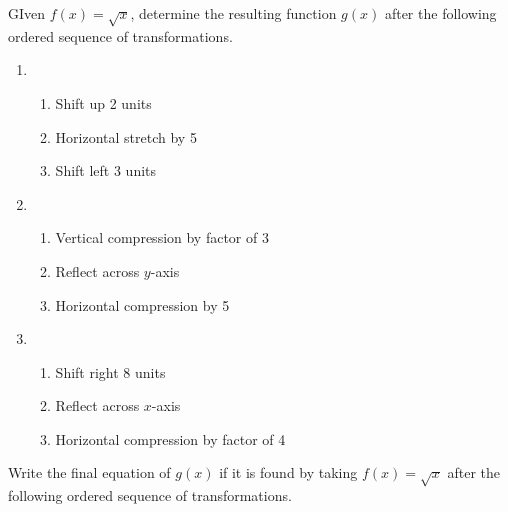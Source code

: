 GIven $f(x) = \sqrt{x}$, determine the resulting function $g(x)$ after the following ordered sequence of transformations.
\begin{enumerate}
\setcounter{enumi}{\value{Review}}
\item
\begin{enumerate}[(1)]
\item Shift up 2 units
\item Horizontal stretch by 5
\item Shift left 3 units
\end{enumerate}

\item
\begin{enumerate}[(1)]
\item Vertical compression by factor of 3
\item Reflect across $y$-axis
\item Horizontal compression by 5
\end{enumerate}

\item
\begin{enumerate}[(1)]
\item Shift right 8 units
\item Reflect across $x$-axis
\item Horizontal compression by factor of 4
\end{enumerate}
\setcounter{Review}{\value{enumi}}
\end{enumerate}

\newpage

Write the final equation of $g(x)$ if it is found by taking $f(x) = \sqrt{x}$ after the following ordered sequence of transformations.   

